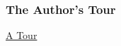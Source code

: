 \documentclass{beamer}
\begin{document}
\begin{frame}
\frametitle{The Author's Tour}
\href{http://mbostock.github.com/d3/talk/20111018/\#0}{A Tour}
\end{frame}



\end{document}
